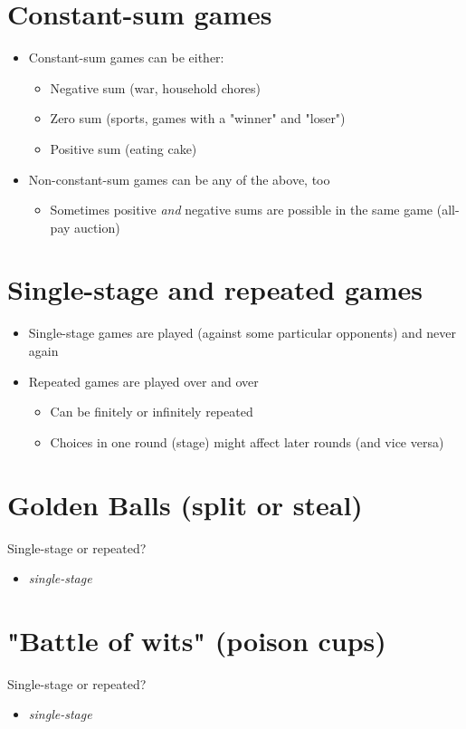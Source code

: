 \documentclass[11pt]{article}
\begin{document}
\section*{Constant-sum games}
\label{sec:org155d7b6}
\begin{itemize}
\item Constant-sum games can be either:
\begin{itemize}
\item Negative sum (war, household chores)
\item Zero sum (sports, games with a "winner" and "loser")
\item Positive sum (eating cake)
\end{itemize}
\item Non-constant-sum games can be any of the above, too
\begin{itemize}
\item Sometimes positive \emph{and} negative sums are possible in the same game (all-pay auction)
\end{itemize}
\end{itemize}

\section*{Single-stage and repeated games}
\label{sec:org30ea0a7}
\begin{itemize}
\item Single-stage games are played (against some particular opponents) and never again
\item Repeated games are played over and over
\begin{itemize}
\item Can be finitely or infinitely repeated
\item Choices in one round (stage) might affect later rounds (and vice versa)
\end{itemize}
\end{itemize}

\section*{Golden Balls (split or steal)}
\label{sec:orgb9e0ef8}
Single-stage or repeated?
\begin{itemize}
\item \emph{single-stage}
\end{itemize}

\section*{"Battle of wits" (poison cups)}
\label{sec:org9b726f6}
Single-stage or repeated?
\begin{itemize}
\item \emph{single-stage}
\end{itemize}
\end{document}
